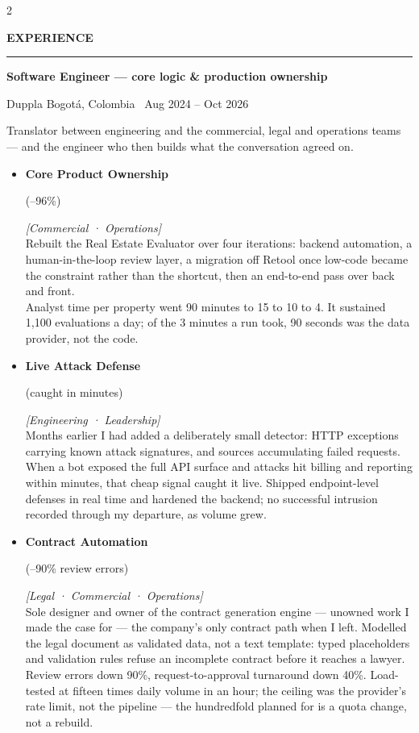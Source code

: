 \documentclass[10pt,a4paper]{article}
\newcommand{\cvsection}[1]{%
  \needspace{3\baselineskip}%
  \par\vspace{2.2ex}%
  {\color{ink}\large\bfseries\MakeUppercase{#1}}\par
  \vspace{0.4ex}%
  {\color{navy}\rule{\linewidth}{0.9pt}}\par
  \vspace{0.9ex}}
\newcommand{\role}[4]{%
  \needspace{4\baselineskip}%
  {\color{ink}\bfseries #1}\par
  \vspace{0.2ex}%
  {\color{navy}\small #2} \; {\color{softgray}\small #3 \textbar\ #4}\par
  \vspace{0.5ex}}
\newcommand{\metric}[1]{{\setlength{\fboxsep}{2pt}\colorbox{whisper}{\color{navy}\bfseries\strut #1}}}
\newcommand{\rolebold}[1]{{\color{navy}\bfseries #1}}
\newcommand{\stakeholders}[1]{{\color{azure}\footnotesize\textit{[#1]}}}
\newcommand{\impact}[1]{{\color{slate}\small #1}}
\newcommand{\impactnext}[1]{\\[0.4em]\impact{#1}}
\begin{document}
\begin{paracol}{2}

\cvsection{Experience}

\role{Software Engineer --- core logic \& production ownership}{Duppla}{Bogotá, Colombia}{Aug 2024 -- Oct 2026}
\impact{Translator between engineering and the commercial, legal and operations teams --- and the engineer who then builds what the conversation agreed on.}
\begin{itemize}
  \item \rolebold{Core Product Ownership} \metric{(--96\%)} \stakeholders{Commercial · Operations}\\
    \impact{Rebuilt the Real Estate Evaluator over four iterations: backend automation, a human-in-the-loop review layer, a migration off Retool once low-code became the constraint rather than the shortcut, then an end-to-end pass over back and front.}
    \impactnext{Analyst time per property went 90 minutes to 15 to 10 to 4. It sustained 1,100 evaluations a day; of the 3 minutes a run took, 90 seconds was the data provider, not the code.}
  \item \rolebold{Live Attack Defense} \metric{(caught in minutes)} \stakeholders{Engineering · Leadership}\\
    \impact{Months earlier I had added a deliberately small detector: HTTP exceptions carrying known attack signatures, and sources accumulating failed requests.}
    \impactnext{When a bot exposed the full API surface and attacks hit billing and reporting within minutes, that cheap signal caught it live. Shipped endpoint-level defenses in real time and hardened the backend; no successful intrusion recorded through my departure, as volume grew.}
  \item \rolebold{Contract Automation} \metric{(--90\% review errors)} \stakeholders{Legal · Commercial · Operations}\\
    \impact{Sole designer and owner of the contract generation engine --- unowned work I made the case for --- the company's only contract path when I left. Modelled the legal document as validated data, not a text template: typed placeholders and validation rules refuse an incomplete contract before it reaches a lawyer.}
    \impactnext{Review errors down 90\%, request-to-approval turnaround down 40\%. Load-tested at fifteen times daily volume in an hour; the ceiling was the provider's rate limit, not the pipeline --- the hundredfold planned for is a quota change, not a rebuild.}

\end{itemize}
\end{paracol}
\end{document}
